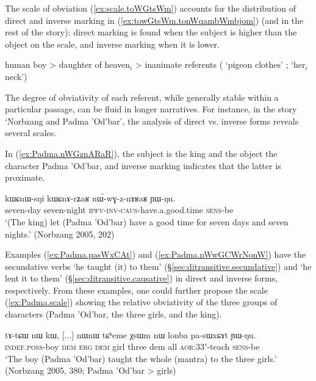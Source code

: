 The scale of obviation (\ref{ex:scale.toWGtsWm}) accounts for the distribution of direct and inverse marking in (\ref{ex:towGtsWm.tonWqambWmbjom}) (and in the rest of the story): direct marking is found when the subject is higher than the object on the scale, and inverse marking when it is lower.

\begin{exe}
\ex \label{ex:scale.toWGtsWm}
\glt human boy > daughter of heaven$_i$ > inanimate referents ( `pigeon clothes' ;  `her$_i$ neck')
\end{exe}

The degree of obviativity of each referent, while generally stable within a particular passage, can be fluid in longer narratives. For instance, in the story `Norbzang and Padma 'Od'bar', the analysis of direct vs. inverse forms reveals several scales. 

In (\ref{ex:Padma.nWGznARaR}), the subject is the king and the object the character Padma 'Od'bar, and inverse marking indicates that the latter is proximate.

\begin{exe}
\ex \label{ex:Padma.nWGznARaR}
\gll kɯɕnɯ-sŋi kɯɕnɤ-rʑaʁ nɯ́-wɣ-z-nɤʁaʁ ɲɯ-ŋu. \\
seven-day seven-night \textsc{ipfv}-\textsc{inv}-\textsc{caus}-have.a.good.time \textsc{sens}-be \\
\glt `(The king) let (Padma 'Od'bar) have a good time for seven days and seven nights.' (Norbzang 2005, 202)
\end{exe}

Examples (\ref{ex:Padma.pasWxCAt}) and (\ref{ex:Padma.nWwGCWrNonW}) have the secundative verbs  `he taught (it) to them' (§\ref{sec:ditransitive.secundative}) and  `he lent it to them' (§\ref{sec:ditransitive.causative}) in direct and inverse forms, respectively. From these examples, one could further propose the scale (\ref{ex:Padma.scale}) showing the relative obviativity of the three groups of characters (Padma 'Od'bar, the three girls, and the king).

\begin{exe}
\ex \label{ex:Padma.pasWxCAt}
\gll tɤ-tɕɯ nɯ kɯ, [...] nɯnɯ tɕʰeme χsɯm nɯ lonba pa-sɯxɕɤt ɲɯ-ŋu. \\
\textsc{indef}.\textsc{poss}-boy \textsc{dem} \textsc{erg} { } \textsc{dem} girl three dem all \textsc{aor}:3\fl{}3$'$-teach \textsc{sens}-be \\
\glt `The boy (Padma 'Od'bar) taught the whole (mantra) to the three girls.' (Norbzang 2005, 380; Padma 'Od'bar > girls)
\end{exe}

